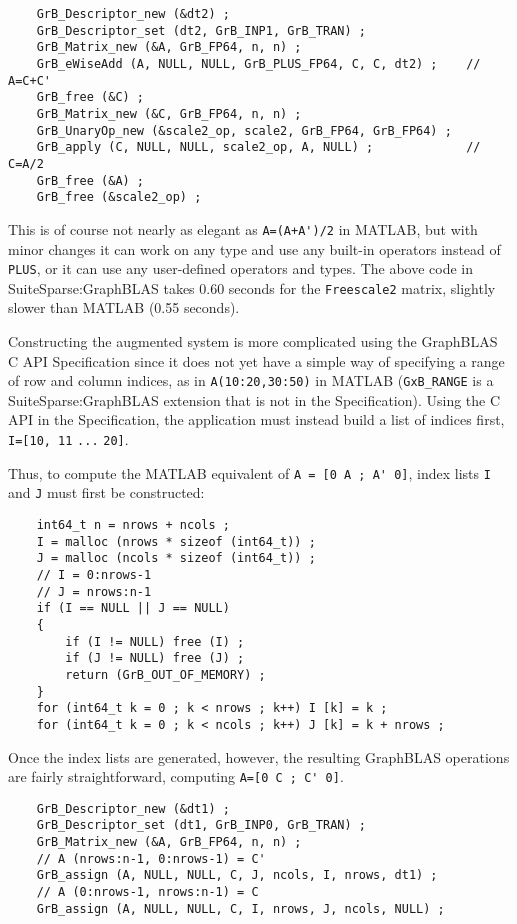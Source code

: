 \documentclass[12pt]{article}
\begin{document}
    \vspace{-0.05in}
    {\footnotesize
    \begin{verbatim}
    GrB_Descriptor_new (&dt2) ;
    GrB_Descriptor_set (dt2, GrB_INP1, GrB_TRAN) ;
    GrB_Matrix_new (&A, GrB_FP64, n, n) ;
    GrB_eWiseAdd (A, NULL, NULL, GrB_PLUS_FP64, C, C, dt2) ;    // A=C+C'
    GrB_free (&C) ;
    GrB_Matrix_new (&C, GrB_FP64, n, n) ;
    GrB_UnaryOp_new (&scale2_op, scale2, GrB_FP64, GrB_FP64) ;
    GrB_apply (C, NULL, NULL, scale2_op, A, NULL) ;             // C=A/2
    GrB_free (&A) ;
    GrB_free (&scale2_op) ; \end{verbatim}}

This is of course not nearly as elegant as \verb"A=(A+A')/2" in MATLAB, but
with minor changes it can work on any type and use any built-in operators
instead of \verb'PLUS', or it can use any user-defined operators and types.
The above code in SuiteSparse:GraphBLAS takes 0.60 seconds for the
\verb'Freescale2' matrix, slightly slower than MATLAB (0.55 seconds).

Constructing the augmented system is more complicated using the GraphBLAS C API
Specification since it does not yet have a simple way of specifying a range of
row and column indices, as in \verb'A(10:20,30:50)' in MATLAB (\verb'GxB_RANGE'
is a SuiteSparse:GraphBLAS extension that is not in the Specification).  Using
the C API in the Specification, the application must instead build a list of
indices first, \verb'I=[10, 11' \verb'...' \verb'20]'.

Thus, to compute the MATLAB equivalent of \verb"A = [0 A ; A' 0]", index lists
\verb'I' and \verb'J' must first be constructed:

    \vspace{-0.05in}
    {\footnotesize
    \begin{verbatim}
    int64_t n = nrows + ncols ;
    I = malloc (nrows * sizeof (int64_t)) ;
    J = malloc (ncols * sizeof (int64_t)) ;
    // I = 0:nrows-1
    // J = nrows:n-1
    if (I == NULL || J == NULL)
    {
        if (I != NULL) free (I) ;
        if (J != NULL) free (J) ;
        return (GrB_OUT_OF_MEMORY) ;
    }
    for (int64_t k = 0 ; k < nrows ; k++) I [k] = k ;
    for (int64_t k = 0 ; k < ncols ; k++) J [k] = k + nrows ; \end{verbatim}}

Once the index lists are generated, however, the resulting GraphBLAS operations
are fairly straightforward, computing \verb"A=[0 C ; C' 0]".

    \vspace{-0.05in}
    {\footnotesize
    \begin{verbatim}
    GrB_Descriptor_new (&dt1) ;
    GrB_Descriptor_set (dt1, GrB_INP0, GrB_TRAN) ;
    GrB_Matrix_new (&A, GrB_FP64, n, n) ;
    // A (nrows:n-1, 0:nrows-1) = C'
    GrB_assign (A, NULL, NULL, C, J, ncols, I, nrows, dt1) ;
    // A (0:nrows-1, nrows:n-1) = C
    GrB_assign (A, NULL, NULL, C, I, nrows, J, ncols, NULL) ; \end{verbatim}}
\end{document}
